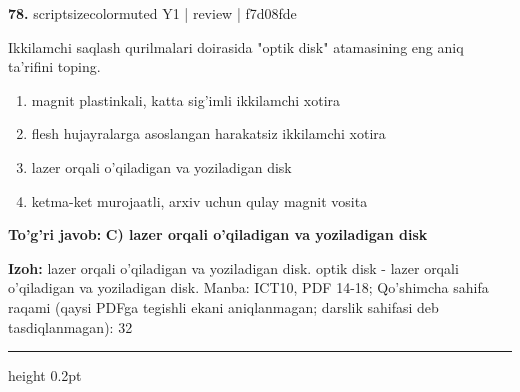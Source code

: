 \documentclass[10pt,a4paper]{article}
\begin{document}
{\bfseries\sffamily\color{ink} 78.} {scriptsizecolor{muted} Y1 | review | f7d08fde}
\par
Ikkilamchi saqlash qurilmalari doirasida "optik disk" atamasining eng aniq ta'rifini toping.
\begin{enumerate}[label=\Alph*),leftmargin=9mm]
\item magnit plastinkali, katta sig'imli ikkilamchi xotira
\item flesh hujayralarga asoslangan harakatsiz ikkilamchi xotira
\item lazer orqali o'qiladigan va yoziladigan disk
\item ketma-ket murojaatli, arxiv uchun qulay magnit vosita
\end{enumerate}
\begin{tcolorbox}[enhanced,breakable,colback=teal!4,colframe=teal!60!black,boxrule=0.45pt,arc=1.2mm,left=2.7mm,right=2.7mm,top=1.8mm,bottom=1.8mm,before skip=2mm,after skip=2mm]
{\bfseries\sffamily\color{teal}To'g'ri javob:} \textbf{C) lazer orqali o'qiladigan va yoziladigan disk}
\par\smallskip
{\bfseries Izoh:} lazer orqali o'qiladigan va yoziladigan disk. optik disk - lazer orqali o'qiladigan va yoziladigan disk. Manba: ICT10, PDF 14-18; Qo'shimcha sahifa raqami (qaysi PDFga tegishli ekani aniqlanmagan; darslik sahifasi deb tasdiqlanmagan): 32
\end{tcolorbox}
\vspace{2mm}\hrule height 0.2pt\vspace{3mm}
\end{document}
